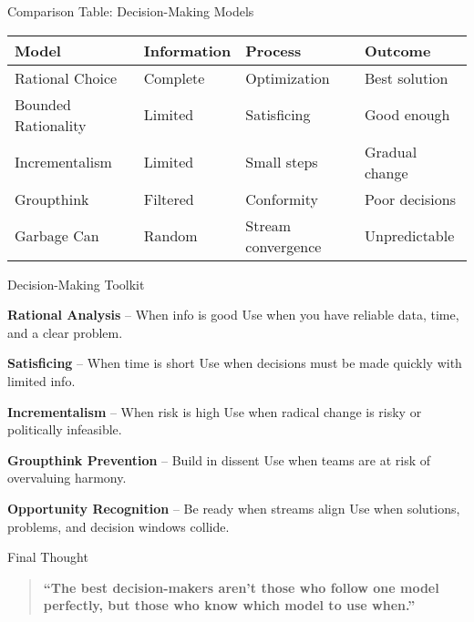 \documentclass[10pt]{beamer}
\begin{document}
\begin{frame}{Comparison Table: Decision-Making Models}
\begin{tabularx}{\textwidth}{l X X X}
\toprule
\textbf{Model} & \textbf{Information} & \textbf{Process} & \textbf{Outcome} \\
\midrule
Rational Choice & Complete & Optimization & Best solution \\
Bounded Rationality & Limited & Satisficing & Good enough \\
Incrementalism & Limited & Small steps & Gradual change \\
Groupthink & Filtered & Conformity & Poor decisions \\
Garbage Can & Random & Stream convergence & Unpredictable \\
\bottomrule
\end{tabularx}
\end{frame}

\begin{frame}{Decision-Making Toolkit}
\begin{block}{\textbf{Rational Analysis} -- When info is good}
Use when you have reliable data, time, and a clear problem. 
\end{block}

\begin{block}{\textbf{Satisficing} -- When time is short}
Use when decisions must be made quickly with limited info. 
\end{block}

\begin{block}{\textbf{Incrementalism} -- When risk is high}
Use when radical change is risky or politically infeasible. 
\end{block}

\begin{block}{\textbf{Groupthink Prevention} -- Build in dissent}
Use when teams are at risk of overvaluing harmony. 
\end{block}

\begin{block}{\textbf{Opportunity Recognition} -- Be ready when streams align}
Use when solutions, problems, and decision windows collide. 
\end{block}
\end{frame}

\begin{frame}{Final Thought}
\begin{quote}
\textbf{``The best decision-makers aren't those who follow one model perfectly, but those who know which model to use when.''}
\end{quote}
\end{frame}
\end{document}
